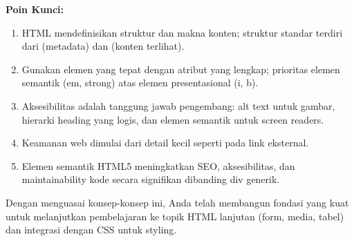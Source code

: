 \documentclass[../main.tex]{subfiles}
\begin{document}
\begin{rangkuman}
\textbf{Poin Kunci:}
\begin{enumerate}[leftmargin=*]
  \item HTML mendefinisikan struktur dan makna konten; struktur standar terdiri dari  (metadata) dan  (konten terlihat).
  \item Gunakan elemen yang tepat dengan atribut yang lengkap; prioritas elemen semantik (em, strong) atas elemen presentasional (i, b).
  \item Aksesibilitas adalah tanggung jawab pengembang: alt text untuk gambar, hierarki heading yang logis, dan elemen semantik untuk screen readers.
  \item Keamanan web dimulai dari detail kecil seperti  pada link eksternal.
  \item Elemen semantik HTML5 meningkatkan SEO, aksesibilitas, dan maintainability kode secara signifikan dibanding div generik.
\end{enumerate}

Dengan menguasai konsep-konsep ini, Anda telah membangun fondasi yang kuat untuk melanjutkan pembelajaran ke topik HTML lanjutan (form, media, tabel) dan integrasi dengan CSS untuk styling.
\end{rangkuman}

\ifSubfilesClassLoaded{
  \renewcommand{\bibname}{Daftar Pustaka}
  
  
}{}
\end{document}
